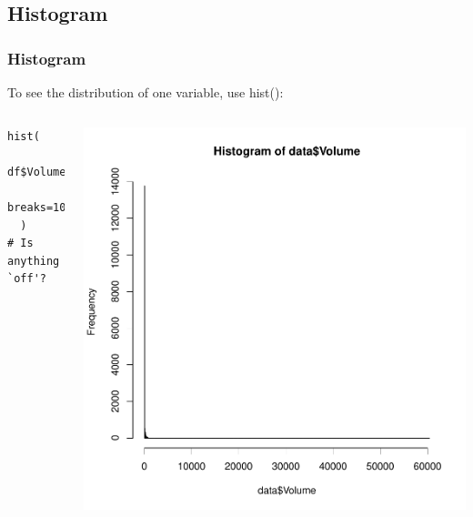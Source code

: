 
\subsection{Histogram}

\begin{frame}
	\frametitle{Histogram}
To see the distribution of one variable, use \ttfamily hist(): \normalfont

    \begin{columns}
  \begin{lstlisting}
hist(
  df$Volume, 
  breaks=1000
  )
# Is anything `off'?
  \end{lstlisting}

        \begin{center}
           \includegraphics[scale=0.3]{images/histogram.pdf}
        \end{center}  
\end{columns}

\newpage      


\end{frame}
